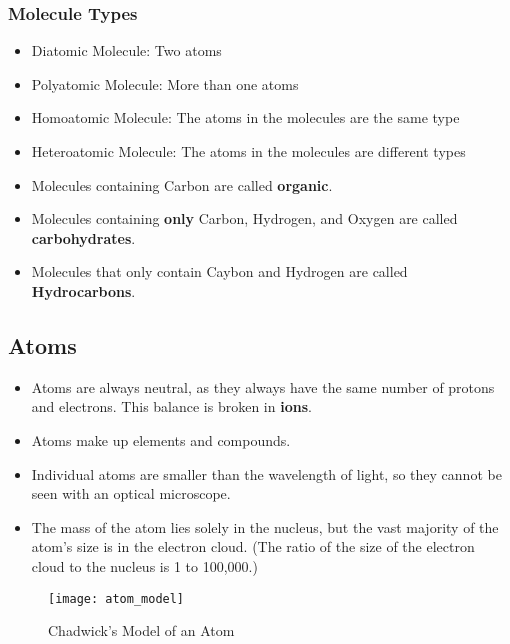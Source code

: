 \subsubsection{Molecule Types}

\begin{itemize}
\item Diatomic Molecule: Two atoms
\item Polyatomic Molecule: More than one atoms
\item Homoatomic Molecule: The atoms in the molecules are the same type
\item Heteroatomic Molecule: The atoms in the molecules are different types
\end{itemize}

\noindent
{}

\begin{itemize}
\item Molecules containing Carbon are called \textbf{organic}.
\item Molecules containing \textbf{only} Carbon, Hydrogen, and Oxygen are called \textbf{carbohydrates}.
\item Molecules that only contain Caybon and Hydrogen are called \textbf{Hydrocarbons}.
\end{itemize}

\subsection{Atoms}

\begin{itemize}
\item Atoms are always neutral, as they always have the same number of protons and electrons. This balance is broken in \textbf{ions}.
\item Atoms make up elements and compounds.
\item Individual atoms are smaller than the wavelength of light, so they cannot be seen with an optical microscope.
\item The mass of the atom lies solely in the nucleus, but the vast majority of the atom's size is in the electron cloud. (The ratio of the size of the electron cloud to the nucleus is 1 to 100,000.)
\end{itemize}

\begin{figure}[H]
	\centering
	\texttt{[image: atom\_model]}
	\caption{Chadwick's Model of an Atom}
\end{figure}

